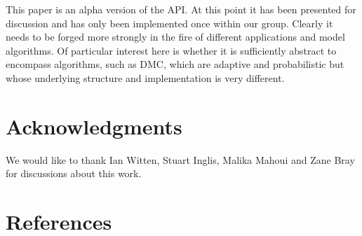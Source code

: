 \documentclass[11pt]{article}
\begin{document}
This paper is an alpha version of the API.  At this point it has been
presented for discussion and has only been implemented once within our
group. Clearly it needs to be forged more strongly in the fire of different
applications and model algorithms.  Of particular interest here is whether it
is sufficiently abstract to encompass algorithms, such as DMC, which are
adaptive and probabilistic but whose underlying structure and
implementation is very different.

\section{Acknowledgments}

We would like to thank Ian Witten, Stuart Inglis, Malika Mahoui and Zane
Bray for discussions about this work.

\section{References}
\end{document}
